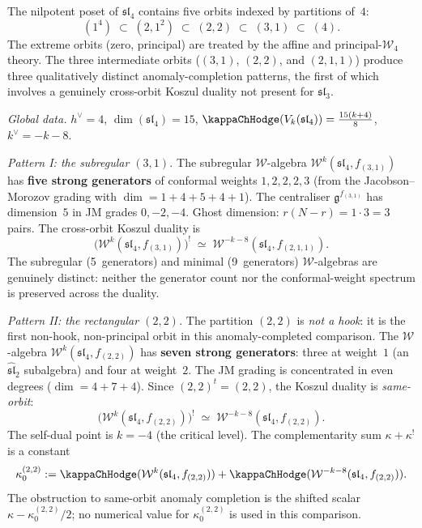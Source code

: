 \begin{construction}
\label{constr:sl4-hook-anomaly-completion}
The nilpotent poset of $\mathfrak{sl}_4$ contains five orbits
indexed by partitions of~$4$:
\[
(1^4)\;\subset\;(2,1^2)\;\subset\;(2,2)\;\subset\;(3,1)\;\subset\;(4).
\]
The extreme orbits (zero, principal) are treated by the affine
and principal-$\mathcal W_4$ theory.
The three intermediate orbits ($(3,1)$, $(2,2)$, and
$(2,1,1)$) produce three qualitatively distinct anomaly-completion
patterns, the first of which involves a genuinely cross-orbit
Koszul duality not present for $\mathfrak{sl}_3$.

\emph{Global data.}
$h^\vee=4$, $\dim(\mathfrak{sl}_4)=15$,
$\kappaChHodge(V_k(\mathfrak{sl}_4))=\frac{15(k+4)}{8}$,
$k^\vee=-k-8$.

\smallskip
\emph{Pattern I: the subregular $(3,1)$.}
The subregular $\mathcal W$-algebra
$\mathcal W^k(\mathfrak{sl}_4,f_{(3,1)})$ has \textbf{five strong
generators} of conformal weights $1,2,2,2,3$ (from the
Jacobson--Morozov grading with $\dim=1{+}4{+}5{+}4{+}1$).
The centraliser $\mathfrak{g}^{f_{(3,1)}}$ has dimension~$5$
in JM grades $0,-2,-4$.
Ghost dimension: $r(N{-}r)=1\cdot 3=3$ pairs.
The cross-orbit Koszul duality is
\[
\bigl(\mathcal W^k(\mathfrak{sl}_4,f_{(3,1)})\bigr)^!
\;\simeq\;
\mathcal W^{-k-8}(\mathfrak{sl}_4,f_{(2,1,1)}).
\]
The subregular (5~generators) and minimal (9~generators) $\mathcal W$-algebras
are genuinely distinct: neither the generator count
nor the conformal-weight spectrum is preserved across the duality.

\smallskip
\emph{Pattern II: the rectangular $(2,2)$.}
The partition $(2,2)$ is \emph{not a hook}: it is the first
non-hook, non-principal orbit in this anomaly-completed comparison.
The $\mathcal W$-algebra
$\mathcal W^k(\mathfrak{sl}_4,f_{(2,2)})$ has \textbf{seven strong
generators}: three at weight~$1$ (an $\widehat{\mathfrak{sl}}_2$
subalgebra) and four at weight~$2$.
The JM grading is concentrated in even degrees ($\dim=4{+}7{+}4$).
Since $(2,2)^t=(2,2)$, the Koszul duality is \emph{same-orbit}:
\[
\bigl(\mathcal W^k(\mathfrak{sl}_4,f_{(2,2)})\bigr)^!
\;\simeq\;
\mathcal W^{-k-8}(\mathfrak{sl}_4,f_{(2,2)}).
\]
The self-dual point is $k=-4$ (the critical level).
The complementarity sum $\kappa+\kappa^!$ is a constant
\[
\kappa_0^{(2,2)}
:=
\kappaChHodge(\mathcal W^k(\mathfrak{sl}_4,f_{(2,2)}))
+\kappaChHodge(\mathcal W^{-k-8}(\mathfrak{sl}_4,f_{(2,2)})).
\]
The obstruction to same-orbit anomaly completion is the shifted scalar
\(\kappa-\kappa_0^{(2,2)}/2\); no numerical value for
\(\kappa_0^{(2,2)}\) is used in this comparison.


\end{construction}
